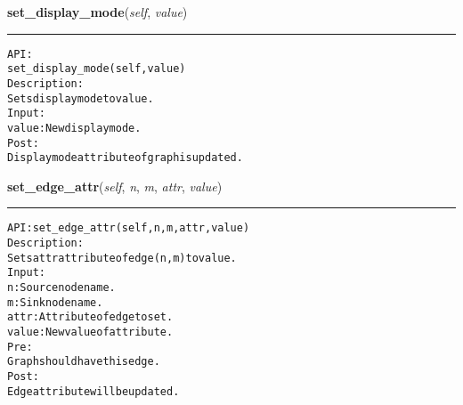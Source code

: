     \vspace{0.5ex}

\hspace{.8\funcindent}\begin{boxedminipage}{\funcwidth}

    \raggedright \textbf{set\_display\_mode}(\textit{self}, \textit{value})

    \vspace{-1.5ex}

    \rule{\textwidth}{0.5\fboxrule}
\setlength{\parskip}{2ex}
\begin{alltt}

API:
    set\_display\_mode(self, value)
Description:
    Sets display mode to value.
Input:
    value: New display mode.
Post:
    Display mode attribute of graph is updated.
\end{alltt}

\setlength{\parskip}{1ex}
    \end{boxedminipage}

    \label{coinor:gimpy:graph:Graph:set_edge_attr}

    \vspace{0.5ex}

\hspace{.8\funcindent}\begin{boxedminipage}{\funcwidth}

    \raggedright \textbf{set\_edge\_attr}(\textit{self}, \textit{n}, \textit{m}, \textit{attr}, \textit{value})

    \vspace{-1.5ex}

    \rule{\textwidth}{0.5\fboxrule}
\setlength{\parskip}{2ex}
\begin{alltt}

API: set\_edge\_attr(self, n, m, attr, value)
Description:
Sets attr attribute of edge (n,m) to value.
Input:
    n: Source node name.
    m: Sink node name.
    attr: Attribute of edge to set.
    value: New value of attribute.
Pre:
    Graph should have this edge.
Post:
    Edge attribute will be updated.
\end{alltt}

\setlength{\parskip}{1ex}
    \end{boxedminipage}

    \label{coinor:gimpy:graph:Graph:set_layout}

